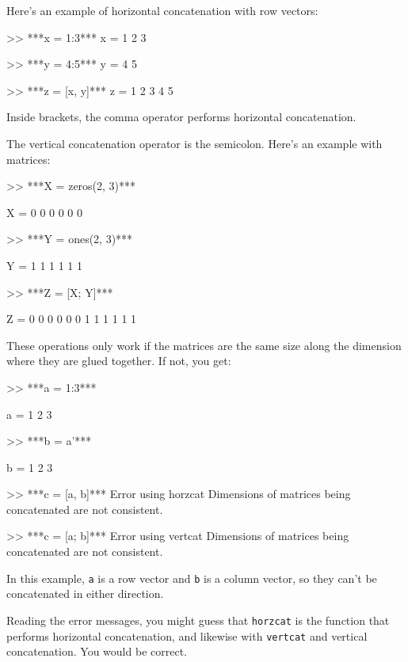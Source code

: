 
Here's an example of horizontal concatenation with row vectors:

\begin{code}
>> ***x = 1:3***
x = 1     2     3

>> ***y = 4:5***
y = 4     5

>> ***z = [x, y]***
z = 1     2     3     4     5
\end{code}

Inside brackets, the comma operator performs horizontal concatenation.

The vertical concatenation operator is the semicolon.  Here's an
example with matrices:


\begin{code}
>> ***X = zeros(2, 3)***

X =  0     0     0
     0     0     0

>> ***Y = ones(2, 3)***

Y =  1     1     1
     1     1     1

>> ***Z = [X; Y]***

Z =  0     0     0
     0     0     0
     1     1     1
     1     1     1
\end{code}

These operations only work if the matrices are the same size along
the dimension where they are glued together.  If not, you get:

\begin{code}
>> ***a = 1:3***

a = 1     2     3

>> ***b = a'***

b =  1
     2
     3

>> ***c = [a, b]***
Error using horzcat
Dimensions of matrices being concatenated are not consistent.

>> ***c = [a; b]***
Error using vertcat
Dimensions of matrices being concatenated are not consistent.
\end{code}

In this example, \lstinline{a} is a row vector and \lstinline{b} is a column
vector, so they can't be concatenated in either direction.

Reading the error messages, you might guess that \lstinline{horzcat}
is the function that performs horizontal concatenation, and likewise
with \lstinline{vertcat} and vertical concatenation.  You would be correct.

